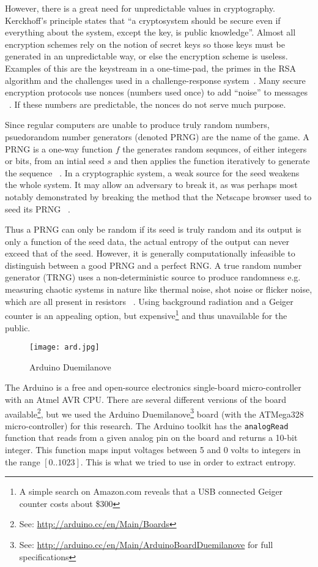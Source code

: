 \documentclass[a4paper]{article}           %
\begin{document}
However, there is a great need for unpredictable values in cryptography. Kerckhoff's principle states that ``a cryptosystem should be secure even if everything about the system, except the key, is public knowledge''. Almost all encryption schemes rely on the notion of secret keys so those keys must be generated in an unpredictable way, or else the encryption scheme is useless. Examples of this are the keystream in a one-time-pad, the primes in the RSA algorithm and the challenges used in a challenge-response system~\cite{menezes1996,anthes2011}. Many secure encryption protocols use nonces (numbers used once) to add ``noise'' to messages ~\cite{anthes2011}. If these numbers are predictable, the nonces do not serve much purpose. 



Since regular computers are unable to produce truly random numbers, psuedorandom number generators (denoted PRNG) are the name of the game. A PRNG is a one-way function $f$ the generates random sequnces, of either integers or bits, from an intial seed $s$ and then applies the function iteratively to generate the sequence ~\cite{menezes1996}. In a cryptographic system, a weak source for the seed weakens the whole system. It may allow an adversary to break it, as was perhaps most notably demonstrated by breaking the method that the Netscape browser used to seed its PRNG ~\cite{netscape}. 

Thus a PRNG can only be random if its seed is truly random and its output is only a function of the seed data, the actual entropy of the output can never exceed that of the seed. However, it is generally computationally infeasible to distinguish between a good PRNG and a perfect RNG. A true random number generator (TRNG) uses a non-deterministic source to produce randomness e.g. measuring chaotic systems in nature like thermal noise, shot noise or flicker noise, which are all present in resistors ~\cite{intel}. Using background radiation and a Geiger counter is an appealing option, but expensive\footnote{A simple search on Amazon.com reveals that a USB connected Geiger counter costs about \$300} and thus unavailable for the public. 

\begin{figure}[H]
  \centering  
  \texttt{[image: ard.jpg]}
  
  \caption{Arduino Duemilanove}
  \label{fig:ard3space}
\end{figure}


The Arduino is a free and open-source electronics single-board micro-controller with an Atmel AVR CPU. There are several different versions of the board available\footnote{See: \url{http://arduino.cc/en/Main/Boards}}, but we used the Arduino Duemilanove\footnote{See: \url{http://arduino.cc/en/Main/ArduinoBoardDuemilanove} for full specifications} board (with the ATMega328 ~\cite{atmegads} micro-controller) for this research. The Arduino toolkit has the \texttt{analogRead} function that reads from a given analog pin on the board and returns a 10-bit integer. This function maps input voltages between 5 and 0 volts to integers in the range $[0..1023]$. This is what we tried to use in order to extract entropy.
\end{document}
